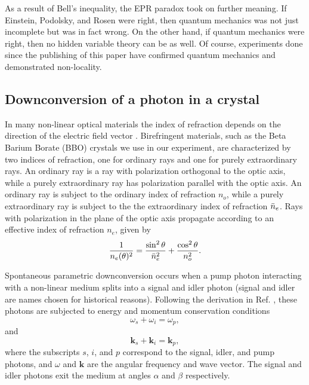 \documentclass[11pt,letterpaper]{article}
\begin{document}
As a result of Bell's inequality, the EPR paradox took on further meaning. If Einstein, Podolsky, and Rosen were right, then quantum mechanics was not just incomplete but was in fact wrong. On the other hand, if quantum mechanics were right, then no hidden variable theory can be as well. Of course, experiments done since the publishing of this paper have confirmed quantum mechanics and demonstrated non-locality.


\subsection{Downconversion of a photon in a crystal}


In many non-linear optical materials the index of refraction depends on the direction of the electric field vector \cite{Betchart}. Birefringent materials, such as the Beta Barium Borate (BBO) crystals we use in our experiment, are characterized by two indices of refraction, one for ordinary rays and one for purely extraordinary rays. An ordinary ray is a ray with polarization orthogonal to the optic axis, while a purely extraordinary ray has polarization parallel with the optic axis. An ordinary ray is subject to the ordinary index of refraction $n_o$, while a purely extraordinary ray is subject to the the extraordinary index of refraction $\Bar{n}_e$. Rays with polarization in the plane of the optic axis propagate according to an effective index of refraction $n_e$, given by
\begin{equation}
    {1 \over n_e(\theta)^2} = {\sin^2\theta \over \Bar{n}_e^2} + {\cos^2\theta \over n_o^2} . \label{index refrax}
\end{equation}

Spontaneous parametric downconversion occurs when a pump photon interacting with a non-linear medium splits into a signal and idler photon (signal and idler are names chosen for historical reasons). Following the derivation in Ref. \cite{Betchart}, these photons are subjected to energy and momentum conservation conditions
\begin{equation}
    \omega_s + \omega_i = \omega_p ,
\end{equation}
and
\begin{equation}
    \textbf{k}_s +\textbf{k}_i = \textbf{k}_p , \label{wave vector eq}
\end{equation}
where the subscripts $s$, $i$, and $p$ correspond to the signal, idler, and pump photons, and $\omega$ and $\textbf{k}$ are the angular frequency and wave vector. The signal and idler photons exit the medium at angles $\alpha$ and $\beta$ respectively.
\end{document}

